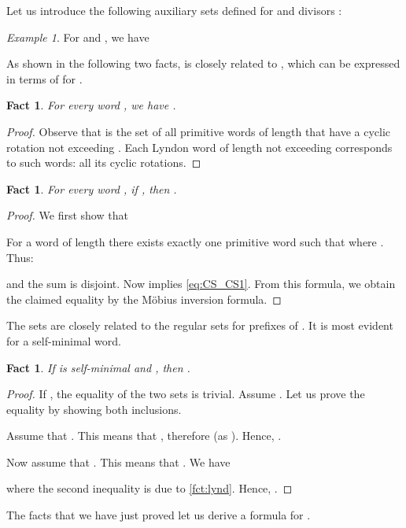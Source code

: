 \documentclass{article}
\newcommand{\mayqed}{}
\newtheorem{fact}[theorem]{Fact}
\theoremstyle{definition}
\theoremstyle{remark}
\newtheorem{example}[theorem]{Example}
\begin{document}
Let us introduce the following auxiliary sets defined for  and divisors :


\begin{example}
  For  and , we have
  
\end{example}

As shown in the following two facts,  is closely related to ,
which can be expressed in terms of  for .

\begin{fact}\label{fct:lyndtocsprime}
For every word , we have .
 \end{fact}
  \begin{proof}
    Observe that  is the set of all primitive words of length  that have a cyclic
    rotation not exceeding . Each Lyndon word of length  not exceeding  
    corresponds to  such words: all its cyclic rotations.
  \mayqed\end{proof}

\begin{fact}\label{fct:csprimetocs}
For every word , if , then .
\end{fact}
\begin{proof}
    We first show that
    
    For a word  of length  there exists exactly one primitive word  such that  where .
    Thus:
    
    and the sum is disjoint.
    Now  implies \eqref{eq:CS_CS1}.
    From this formula, we obtain the claimed equality by the Möbius inversion formula.
\end{proof}

The  sets are closely related to the regular  sets for prefixes  of .
It is most evident for a self-minimal word.

\begin{fact}\label{fct:C1_C}
  If  is self-minimal and , then .
\end{fact}
\begin{proof}
  If , the equality of the two sets is trivial. Assume .
  Let us prove the equality by showing both inclusions.

  Assume that .
  This means that , therefore  (as ).
  Hence, .

  Now assume that .
  This means that .
  We have
  
  where the second inequality is due to \cref{fct:lynd}.
  Hence, .
\mayqed\end{proof}

The facts that we have just proved let us derive a formula for .
\end{document}
